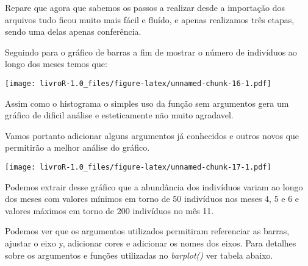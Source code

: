 \documentclass[]{book}
\newenvironment{Shaded}{\begin{snugshade}}{\end{snugshade}}
\newcommand{\DataTypeTok}[1]{\textcolor[rgb]{0.13,0.29,0.53}{#1}}
\newcommand{\DecValTok}[1]{\textcolor[rgb]{0.00,0.00,0.81}{#1}}
\newcommand{\KeywordTok}[1]{\textcolor[rgb]{0.13,0.29,0.53}{\textbf{#1}}}
\newcommand{\NormalTok}[1]{#1}
\newcommand{\OperatorTok}[1]{\textcolor[rgb]{0.81,0.36,0.00}{\textbf{#1}}}
\newcommand{\StringTok}[1]{\textcolor[rgb]{0.31,0.60,0.02}{#1}}
\begin{document}
Repare que agora que sabemos os passos a realizar desde a importação dos arquivos tudo ficou muito mais fácil e fluído, e apenas realizamos três etapas, sendo uma delas apenas conferência.

Seguindo para o gráfico de barras a fim de mostrar o número de indivíduos ao longo dos meses temos que:

\begin{Shaded}
\end{Shaded}

\texttt{[image: livroR-1.0\_files/figure-latex/unnamed-chunk-16-1.pdf]}

Assim como o histograma o simples uso da função sem argumentos gera um gráfico de dificil análise e esteticamente não muito agradavel.

Vamos portanto adicionar alguns argumentos já conhecidos e outros novos que permitirão a melhor análise do gráfico.

\begin{Shaded}
\end{Shaded}

\texttt{[image: livroR-1.0\_files/figure-latex/unnamed-chunk-17-1.pdf]}

Podemos extrair desse gráfico que a abundância dos indivíduos variam ao longo dos meses com valores mínimos em torno de 50 indivíduos nos meses 4, 5 e 6 e valores máximos em torno de 200 indivíduos no mês 11.

Podemos ver que os argumentos utilizados permitiram referenciar as barras, ajustar o eixo y, adicionar cores e adicionar os nomes dos eixos. Para detalhes sobre os argumentos e funções utilizadas no \emph{barplot()} ver tabela abaixo.
\end{document}
